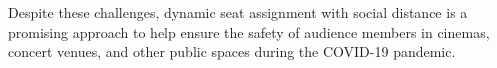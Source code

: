Despite these challenges, dynamic seat assignment with social distance is a promising approach to help ensure the safety of audience members in cinemas, concert venues, and other public spaces during the COVID-19 pandemic.















\newpage
